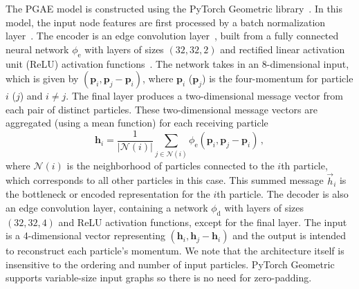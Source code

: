 \documentclass[letterpaper,11pt]{article}
\begin{document}
The PGAE model is constructed using the PyTorch Geometric library~\cite{PyTorchGeometric}.
In this model, the input node features are first processed by a batch normalization layer~\cite{batchnorm}.
The encoder is an edge convolution layer~\cite{DGCNN}, built from a fully connected neural network $\phi_\mathrm{e}$ with layers of sizes $(32, 32, 2)$ and rectified linear activation unit (ReLU) activation functions~\cite{relu}.
The network takes in an 8-dimensional input, which is given by $(\boldsymbol{p}_i, \boldsymbol{p}_j-\boldsymbol{p}_i)$, where $\boldsymbol{p}_i$ ($\boldsymbol{p}_j$) is the four-momentum for particle $i$ ($j$) and $i\neq j$.
The final layer produces a two-dimensional message vector from each pair of distinct particles.
These two-dimensional message vectors are aggregated (using a mean function) for each receiving particle
\begin{equation}
\boldsymbol{h}_i = \frac{1}{|\mathcal N(i)|}\sum_{j\in \mathcal N(i)} \phi_\mathrm{e}(\boldsymbol{p}_i, \boldsymbol{p}_j-\boldsymbol{p}_i)\,,
\end{equation}
where $\mathcal N(i)$ is the neighborhood of particles connected to the $i$th particle, which corresponds to all other particles in this case.
This summed message $\vec h_i$ is the bottleneck or encoded representation for the $i$th particle.
The decoder is also an edge convolution layer, containing a network $\phi_\mathrm{d}$ with layers of sizes $(32, 32, 4)$ and ReLU activation functions, except for the final layer.
The input is a 4-dimensional vector representing $(\boldsymbol{h}_i, \boldsymbol{h}_j-\boldsymbol{h}_i)$ and the output is intended to reconstruct each particle's momentum.
We note that the architecture itself is insensitive to the ordering and number of input particles. 
PyTorch Geometric supports variable-size input graphs so there is no need for zero-padding.
\end{document}
